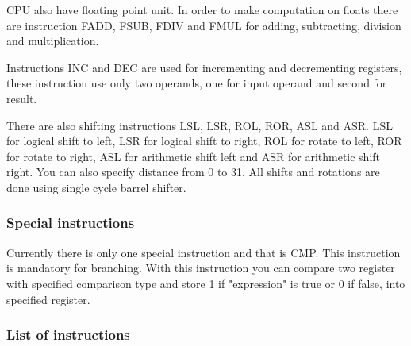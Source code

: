 CPU also have floating point unit. In order to make computation on floats there
are instruction FADD, FSUB, FDIV and FMUL for adding, subtracting, division
and multiplication.

Instructions INC and DEC are used for incrementing and decrementing registers,
these instruction use only two operands, one for input operand and second for
result.

There are also shifting instructions LSL, LSR, ROL, ROR, ASL and ASR. LSL for
logical shift to left, LSR for logical shift to right, ROL for rotate to left,
ROR for rotate to right, ASL for arithmetic shift left and ASR for arithmetic
shift right. You can also specify distance from 0 to 31. All shifts and rotations
are done using single cycle barrel shifter.

\subsubsection{Special instructions}

Currently there is only one special instruction and that is CMP. This
instruction is mandatory for branching. With this instruction you can compare
two register with specified comparison type and store 1 if "expression" is true
or 0 if false, into specified register.


\subsubsection{List of instructions}

